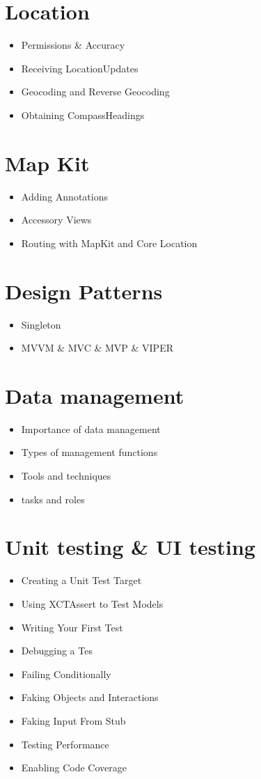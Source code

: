 \documentclass[14pt]{extarticle}
\begin{document}
\section{Location}
\begin{itemize}
	\item Permissions \& Accuracy
	\item Receiving LocationUpdates
	\item Geocoding and Reverse Geocoding
	\item Obtaining CompassHeadings
\end{itemize}

\section{Map Kit}
\begin{itemize}
	\item Adding Annotations
	\item Accessory Views
	\item Routing with MapKit and Core Location
\end{itemize}

\section{Design Patterns}
\begin{itemize}
	\item Singleton
	\item MVVM \& MVC \& MVP \& VIPER
\end{itemize}

\section{Data management}
\begin{itemize}
	\item Importance of data management
	\item Types of management functions
	\item Tools and techniques
	\item tasks and roles
\end{itemize}

\section{Unit testing \& UI testing}
\begin{itemize}
	\item Creating a Unit Test Target
	\item Using XCTAssert to Test Models
	\item Writing Your First Test
	\item Debugging a Tes
	\item Failing Conditionally
	\item Faking Objects and Interactions
	\item Faking Input From Stub
	\item Testing Performance
	\item Enabling Code Coverage
\end{itemize}
\end{document}
